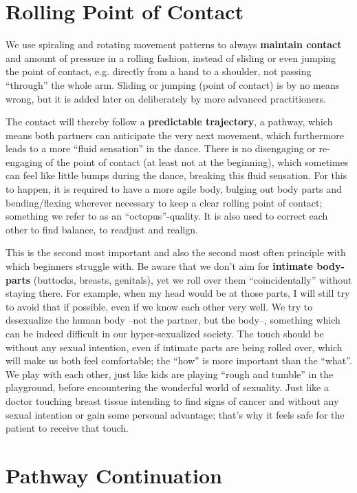 \section{Rolling Point of Contact}\label{sec:rolling-point-of-contact}

We use spiraling and rotating movement patterns to always \textbf{maintain contact} and amount of pressure in a rolling fashion, instead of sliding or even jumping the point of contact, e.g. directly from a hand to a shoulder, not passing ``through'' the whole arm.
Sliding or jumping (point of contact) is by no means wrong, but it is added later on deliberately by more advanced practitioners.

The contact will thereby follow a \textbf{predictable trajectory}, a pathway, which means both partners can anticipate the very next movement, which furthermore leads to a more ``fluid sensation'' in the dance.
There is no disengaging or re-engaging of the point of contact (at least not at the beginning), which sometimes can feel like little bumps during the dance, breaking this fluid sensation.
For this to happen, it is required to have a more agile body, bulging out body parts and bending/flexing wherever necessary to keep a clear rolling point of contact; something we refer to as an ``octopus''-quality.
It is also used to correct each other to find balance, to readjust and realign.

This is the second most important and also the second most often principle with which beginners struggle with.
Be aware that we don't aim for \textbf{intimate body-parts} (buttocks, breasts, genitals), yet we roll over them ``coincidentally'' without staying there.
For example, when my head would be at those parts, I will still try to avoid that if possible, even if we know each other very well.
We try to desexualize the human body --not the partner, but the body--, something which can be indeed difficult in our hyper-sexualized society.
The touch should be without any sexual intention, even if intimate parts are being rolled over, which will make us both feel comfortable; the ``how'' is more important than the ``what''.
We play with each other, just like kids are playing ``rough and tumble'' in the playground, before encountering the wonderful world of sexuality.
Just like a doctor touching breast tissue intending to find signs of cancer and without any sexual intention or gain some personal advantage; that's why it feels safe for the patient to receive that touch.

\section{Pathway Continuation}\label{sec:pathway-continuation}

